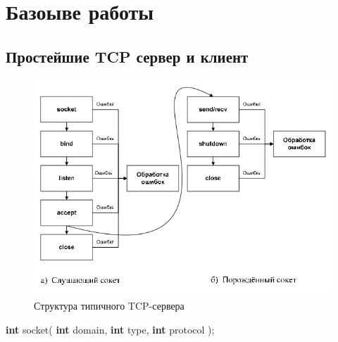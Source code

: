 \documentclass[a4paper]{article}
\begin{document}
\section{Базоыве работы}
\subsection{Простейшие TCP сервер и клиент}
\begin{figure}[H]
\begin{center}
\includegraphics[scale=0.7]{pics/ttcps.png}
\caption{Структура типичного TCP-сервера}
\label{pic:ttcps}
\end{center}
\end{figure}
\begin{center}
\textbf{int} socket( \textbf{int} domain, \textbf{int} type, \textbf{int} protocol );
\end{center}
\end{document}
